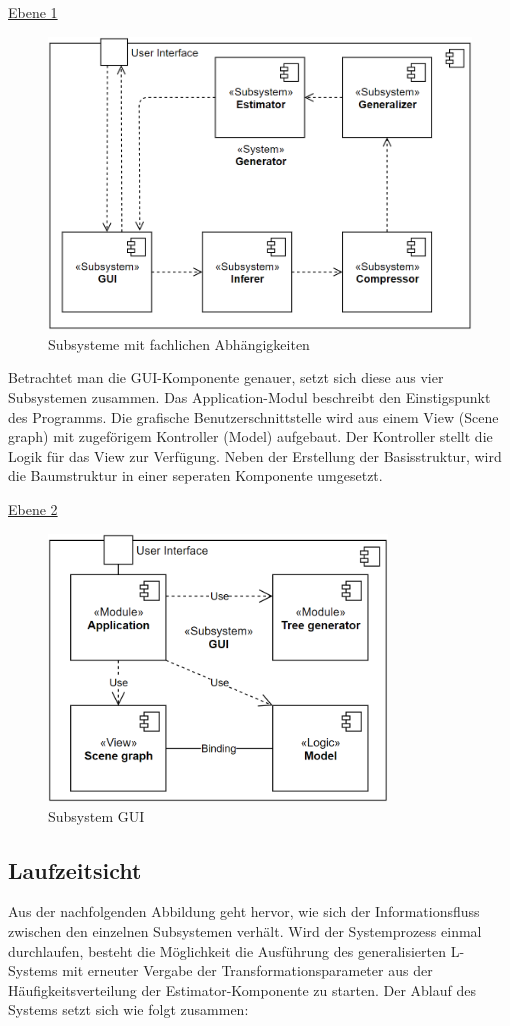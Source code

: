 \underline{Ebene 1}
\begin{figure}[H]
    \centering
    \includegraphics[width=12cm]{../images/Bausteinsicht_Ebene_1.PNG}
    \caption{Subsysteme mit fachlichen Abhängigkeiten}
\end{figure}

Betrachtet man die GUI-Komponente genauer, setzt sich diese aus vier Subsystemen zusammen.
Das Application-Modul beschreibt den Einstigspunkt des Programms.
Die grafische Benutzerschnittstelle wird aus einem View (Scene graph) mit zugeförigem Kontroller (Model)
aufgebaut.
Der Kontroller stellt die Logik für das View zur Verfügung.
Neben der Erstellung der Basisstruktur, wird die Baumstruktur in einer seperaten Komponente umgesetzt.

\underline{Ebene 2}
\begin{figure}[H]
    \centering
    \includegraphics[width=9cm]{../images/Bausteinsicht_Ebene_2.PNG}
    \caption{Subsystem GUI}
\end{figure}

\subsection*{Laufzeitsicht}
Aus der nachfolgenden Abbildung geht hervor, wie sich der Informationsfluss zwischen den einzelnen Subsystemen verhält.
Wird der Systemprozess einmal durchlaufen, besteht die Möglichkeit die Ausführung des generalisierten L-Systems mit
erneuter Vergabe der Transformationsparameter aus der Häufigkeitsverteilung der Estimator-Komponente zu starten.
Der Ablauf des Systems setzt sich wie folgt zusammen:

